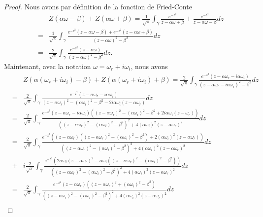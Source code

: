 \begin{proof}
  Nous avons par définition de la fonction de Fried-Conte
  \begin{eqnarray*}
    &&Z(\alpha\omega-\beta)+Z(\alpha\omega+\beta)=\frac{1}{\sqrt{\pi}}\int_\gamma\frac{e^{-z^2}}{z-\alpha\omega+\beta}+\frac{e^{-z^2}}{z-\alpha\omega-\beta}dz\\
    &=&\frac{1}{\sqrt{\pi}}\int_\gamma\frac{e^{-z^2}(z-\alpha\omega-\beta)+e^{-z^2}(z-\alpha\omega+\beta)}{(z-\alpha\omega)^2-\beta^2}dz\\
    &=&\frac{2}{\sqrt{\pi}}\int_\gamma\frac{e^{-z^2}(z-\alpha\omega)}{(z-\alpha\omega)^2-\beta^2}dz.
  \end{eqnarray*}
  Maintenant, avec la notation $\omega=\omega_r+i\omega_i$, nous avons
  \begin{eqnarray*}
    &&Z(\alpha(\omega_r+i\omega_i)-\beta)+Z(\alpha(\omega_r+i\omega_i)+\beta)=\frac{2}{\sqrt{\pi}}\int_\gamma\frac{e^{-z^2}(z-\alpha\omega_r-i\alpha\omega_i)}{(z-\alpha\omega_r-i\alpha\omega_i)^2-\beta^2}dz\\
    &=&\frac{2}{\sqrt{\pi}}\int_\gamma\frac{e^{-z^2}(z-\alpha\omega_r-i\alpha\omega_i)}{(z-\alpha\omega_r)^2-(\alpha\omega_i)^2-\beta^2-2i\alpha\omega_i(z-\alpha\omega_r)}dz\\
    &=&\frac{2}{\sqrt{\pi}}\int_\gamma\frac{e^{-z^2}(z-\alpha\omega_r-i\alpha\omega_i)\left((z-\alpha\omega_r)^2-(\alpha\omega_i)^2-\beta^2+2i\alpha\omega_i(z-\omega_r)\right)}{\left((z-\alpha\omega_r)^2-(\alpha\omega_i)^2-\beta^2\right)^2+4\left(\alpha\omega_i\right)^2(z-\alpha\omega_r)^2}dz\\
    &=&\frac{2}{\sqrt{\pi}}\int_\gamma\frac{e^{-z^2}\left((z-\alpha\omega_r)\left((z-\alpha\omega_r)^2-(\alpha\omega_i)^2-\beta^2\right)+2(\alpha\omega_i)^2(z-\alpha\omega_r)\right)}{\left((z-\alpha\omega_r)^2-(\alpha\omega_i)^2-\beta^2\right)^2+4\left(\alpha\omega_i\right)^2(z-\alpha\omega_r)^2}dz\\
    &+&i\frac{2}{\sqrt{\pi}}\int_\gamma\frac{e^{-z^2}\left(2\alpha\omega_i(z-\alpha\omega_r)^2-\alpha\omega_i\left((z-\alpha\omega_r)^2-(\alpha\omega_i)^2-\beta^2\right)\right)}{\left((z-\alpha\omega_r)^2-(\alpha\omega_i)^2-\beta^2\right)^2+4\left(\alpha\omega_i\right)^2(z-\alpha\omega_r)^2}dz\\
    &=&\frac{2}{\sqrt{\pi}}\int_\gamma\frac{e^{-z^2}(z-\alpha\omega_r)\left((z-\alpha\omega_r)^2+(\alpha\omega_i)^2-\beta^2\right)}{\left((z-\alpha\omega_r)^2-(\alpha\omega_i)^2-\beta^2\right)^2+4\left(\alpha\omega_i\right)^2(z-\alpha\omega_r)^2}dz\\

\end{eqnarray*}
\end{proof}
